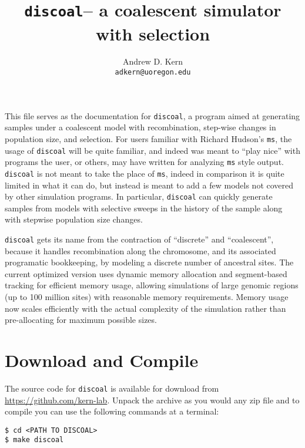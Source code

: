 \documentclass[12pt]{article}
\begin{document}
%
\title{\textbf{\texttt{discoal}}-- a coalescent simulator with selection}
\author{Andrew D. Kern \\
\texttt{adkern@uoregon.edu}\\
}


\maketitle

This file serves as the documentation for \texttt{discoal}, a program aimed at generating samples 
under a coalescent model with recombination, step-wise changes in population size, and selection. 
For users familiar with Richard Hudson's \texttt{ms}, the usage of \texttt{discoal} will be quite
familiar, and indeed was meant to ``play nice'' with programs the user, or others, may have written 
for analyzing \texttt{ms} style output. \texttt{discoal} is not meant to take the place of \texttt{ms},
indeed in comparison it is quite limited in what it can do, but instead is meant to add a few models
not covered by other simulation programs. In particular, \texttt{discoal} can quickly generate samples 
from models with selective sweeps in the history of the sample along with stepwise population size
changes. 

\texttt{discoal} gets its name from the contraction of ``discrete'' and ``coalescent'', because it 
handles recombination along the chromosome, and its associated programatic bookkeeping, by modeling 
a discrete number of ancestral sites. The current optimized version uses dynamic memory allocation and segment-based tracking for efficient memory usage, allowing simulations of large genomic regions (up to 100 million sites) with reasonable memory requirements. Memory usage now scales efficiently with the actual complexity of the simulation rather than pre-allocating for maximum possible sizes.  

\section*{Download and Compile}
The source code for \texttt{discoal} is available for download from \url{https://github.com/kern-lab}. Unpack the archive as you would any zip file and to compile you can use the following commands at a terminal:

\begin{verbatim}
$ cd <PATH TO DISCOAL>
$ make discoal
\end{verbatim}
\end{document}
